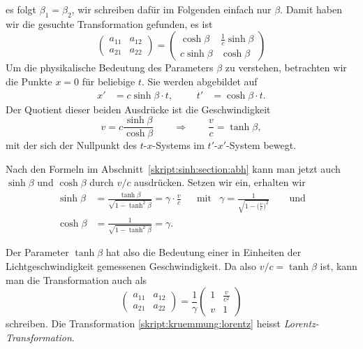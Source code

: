 es folgt $\beta_1=\beta_2$, wir schreiben dafür im Folgenden einfach
nur $\beta$.
Damit haben wir die gesuchte Transformation gefunden, es ist
\begin{equation}
\begin{pmatrix}
a_{11}&a_{12}\\
a_{21}&a_{22}
\end{pmatrix}
=
\begin{pmatrix}
 \cosh\beta&\frac1c\sinh\beta\\
c\sinh\beta&\cosh\beta
\end{pmatrix}
\end{equation}
Um die physikalische Bedeutung des Parameters $\beta$ zu verstehen, 
betrachten wir die Punkte $x=0$ für beliebige $t$.
Sie werden abgebildet auf
\[
\begin{aligned}
x' &= c\sinh\beta \cdot t,
&
&&
t' &=  \cosh\beta \cdot t.
\end{aligned}
\]
Der Quotient dieser beiden Ausdrücke ist die Geschwindigkeit
\[
v = c\frac{\sinh\beta}{\cosh\beta}
\qquad\Rightarrow\qquad
\frac{v}{c}
=
\tanh\beta,
\]
mit der sich der Nullpunkt des $t$-$x$-Systems im $t'$-$x'$-System
bewegt.

Nach den Formeln im Abschnitt~\ref{skript:sinh:section:abh} kann 
man jetzt auch $\sinh\beta$ und $\cosh\beta$ durch $v/c$ ausdrücken.
Setzen wir ein, erhalten wir
\[
\begin{aligned}
\sinh\beta
&=
\frac{\tanh\beta}{\sqrt{1-\tanh^2\beta}}
=
\gamma\cdot\frac{v}{c}
&
&\text{mit}&
\gamma = \frac{1}{\displaystyle\sqrt{1-\biggl(\frac{v}{c}\biggr)^2}}
\qquad\text{und}
\\
\cosh\beta
&=
\frac1{\sqrt{1-\tanh^2\beta}}
=
\gamma.
\end{aligned}
\]

Der Parameter $\tanh\beta$ hat also die Bedeutung einer in Einheiten
der Lichtgeschwindigkeit gemessenen Geschwindigkeit.
Da also $v/c=\tanh\beta$ ist, kann man die Transformation auch
als
\begin{equation}
\begin{pmatrix}
a_{11}&a_{12}\\
a_{21}&a_{22}
\end{pmatrix}
=
\frac{1}{\gamma}
\begin{pmatrix}
\displaystyle 1
	& \displaystyle\frac{v}{c^2}
\\
\displaystyle v
	&\displaystyle 1
\end{pmatrix}
\label{skript:kruemmung:lorentz}
\end{equation}
schreiben.
Die Transformation 
\eqref{skript:kruemmung:lorentz}
heisst {\em Lorentz-Transformation}.


